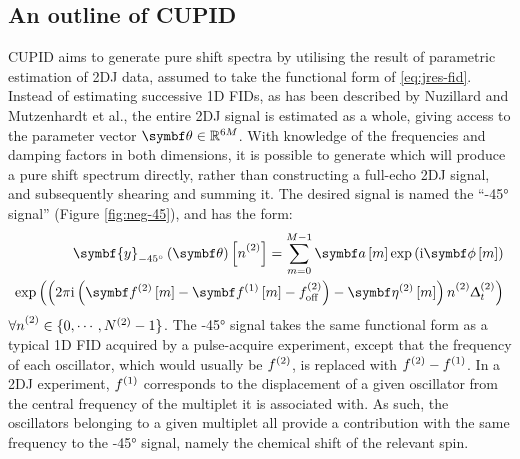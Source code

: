 \subsection{An outline of \acs{CUPID}}
\acf{CUPID} aims to generate pure shift spectra by utilising the result of
parametric estimation of \ac{2DJ} data, assumed to take the functional form of
\eqref{eq:jres-fid}.
Instead of estimating successive \ac{1D} \acp{FID}, as has been described by
Nuzillard and Mutzenhardt et al., the entire \ac{2DJ} signal is estimated as a
whole, giving access to the parameter vector $\bth \in \mathbb{R}^{6M}$. With knowledge of the frequencies and damping factors in both dimensions, it is possible to generate  which will produce a pure shift spectrum directly, rather than constructing a full-echo \ac{2DJ} signal, and subsequently shearing and summing it. The desired signal is named
the ``\ang{-45} signal'' (Figure
\ref{fig:neg-45}), and has the form:
\begin{equation}
    \begin{split}
        \symbf{y}_{\ang{-45}}\left(\bth\right)\left[ \ntwo \right] =
            \sum_{m=0}^{M-1} \bdam \exp \left(\iu \bdphim \right)\\
            \exp\left(
                \left(
                    2 \pi \iu \left(\bdftwom - \bdfonem - \fofftwo\right)
                    - \bdetatwom
                \right) \ntwo \Dttwo
            \right)
    \end{split}
    \label{eq:neg-45}
\end{equation}
$\forall \ntwo \in \lbrace 0, \cdots, \Ntwo - 1 \rbrace$. The \ang{-45} signal
takes the same functional form as a typical \ac{1D}
\ac{FID} acquired by a pulse-acquire experiment, except that the frequency of
each oscillator, which would usually be $f^{(2)}$, is replaced with $f^{(2)} -
f^{(1)}$. In a \ac{2DJ} experiment, $f^{(1)}$ corresponds to the displacement of a
given oscillator from the central frequency of the multiplet it is associated
with. As such, the oscillators belonging to a given multiplet all provide
a contribution with the same frequency to the \ang{-45} signal, namely the
chemical shift of the relevant spin.
